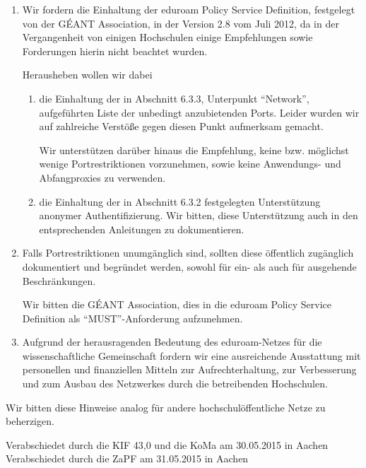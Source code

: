 \documentclass[DIV=calc]{scrartcl}
\begin{document}
  \begin{enumerate}
  \item Wir fordern die Einhaltung der eduroam Policy Service Definition,
    festgelegt von der GÉANT Association, in der Version 2.8 vom Juli 2012, da
    in der Vergangenheit von einigen Hochschulen einige Empfehlungen sowie
    Forderungen hierin nicht beachtet wurden.

    Herausheben wollen wir dabei
    \begin{enumerate}
    \item  die Einhaltung der in Abschnitt 6.3.3, Unterpunkt ``Network'',
      aufgeführten Liste der unbedingt anzubietenden Ports. Leider wurden wir
      auf zahlreiche Verstöße gegen diesen Punkt aufmerksam gemacht.

      Wir unterstützen darüber hinaus die Empfehlung, keine
      bzw. möglichst wenige Portrestriktionen vorzunehmen, sowie keine
      Anwendungs- und Abfangproxies zu verwenden.

    \item die Einhaltung der in Abschnitt 6.3.2 festgelegten Unterstützung
      anonymer Authentifizierung. Wir bitten, diese Unterstützung auch in den
      entsprechenden Anleitungen zu dokumentieren.
    \end{enumerate}
  \item Falls Portrestriktionen unumgänglich sind, sollten diese öffentlich
    zugänglich dokumentiert und begründet werden, sowohl für ein- als auch für
    ausgehende Beschränkungen.

    Wir bitten die GÉANT Association, dies in die eduroam Policy Service Definition
    als ``MUST''-Anforderung aufzunehmen.

  \item Aufgrund der herausragenden Bedeutung des eduroam-Netzes für die
    wissenschaftliche Gemeinschaft fordern wir eine ausreichende Ausstattung mit
    personellen und finanziellen Mitteln zur Aufrechterhaltung, zur Verbesserung
    und zum Ausbau des Netzwerkes durch die betreibenden Hochschulen.
  \end{enumerate}

  Wir bitten diese Hinweise analog für andere hochschulöffentliche Netze zu
  beherzigen.

\vfill
\begin{flushright}
Verabschiedet durch die KIF 43,0 und die KoMa am 30.05.2015 in Aachen \\
Verabschiedet durch die ZaPF am 31.05.2015 in Aachen
\end{flushright}
\end{document}
